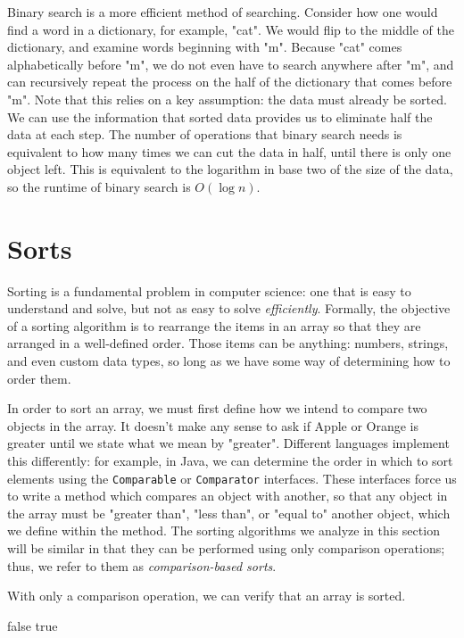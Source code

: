 Binary search is a more efficient method of searching.  Consider how one would find a word in a dictionary, for example, "cat".  We would flip to the middle of the dictionary, and examine words beginning with "m".  Because "cat" comes alphabetically before "m", we do not even have to search anywhere after "m", and can recursively repeat the process on the half of the dictionary that comes before "m".  Note that this relies on a key assumption: the data must already be sorted.  We can use the information that sorted data provides us to eliminate half the data at each step.  The number of operations that binary search needs is equivalent to how many times we can cut the data in half, until there is only one object left.  This is equivalent to the logarithm in base two of the size of the data, so the runtime of binary search is $ O(\log n) $.

\section{Sorts}

Sorting is a fundamental problem in computer science: one that is easy to understand and solve, but not as easy to solve \textit{efficiently}. Formally, the objective of a sorting algorithm is to rearrange the items in an array so that they are arranged in a well-defined order. Those items can be anything: numbers, strings, and even custom data types, so long as we have some way of determining how to order them.

In order to sort an array, we must first define how we intend to compare two objects in the array.  It doesn't make any sense to ask if Apple or Orange is greater until we state what we mean by "greater".  Different languages implement this differently: for example, in Java, we can determine the order in which to sort elements using the \texttt{Comparable} or \texttt{Comparator} interfaces.  These interfaces force us to write a method which compares an object with another, so that any object in the array must be "greater than", "less than", or "equal to" another object, which we define within the method.  The sorting algorithms we analyze in this section will be similar in that they can be performed using only comparison operations; thus, we refer to them as \textit{comparison-based sorts}.

With only a comparison operation, we can verify that an array is sorted.

\begin{algorithm}[H]
\caption{}
\begin{algorithmic}
            \State \Return false
        \EndIf
    \EndFor
    \State \Return true
\EndFunction
\end{algorithmic}
\end{algorithm}


